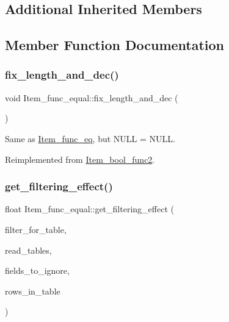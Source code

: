 \subsection*{Additional Inherited Members}


\subsection{Member Function Documentation}
\mbox{\label{classItem__func__equal_a3fe9df49488e4bb555010012b878b499}} 
\subsubsection{\texorpdfstring{fix\+\_\+length\+\_\+and\+\_\+dec()}{fix\_length\_and\_dec()}}
{\footnotesize\ttfamily void Item\+\_\+func\+\_\+equal\+::fix\+\_\+length\+\_\+and\+\_\+dec (\begin{DoxyParamCaption}{ }\end{DoxyParamCaption})\hspace{0.3cm}{\ttfamily [virtual]}}

Same as \mbox{\hyperlink{classItem__func__eq}{Item\+\_\+func\+\_\+eq}}, but N\+U\+LL = N\+U\+LL. 

Reimplemented from \mbox{\hyperlink{classItem__bool__func2}{Item\+\_\+bool\+\_\+func2}}.

\mbox{\label{classItem__func__equal_ac9f18925664d02a73530813c3c2f2710}} 
\subsubsection{\texorpdfstring{get\+\_\+filtering\+\_\+effect()}{get\_filtering\_effect()}}
{\footnotesize\ttfamily float Item\+\_\+func\+\_\+equal\+::get\+\_\+filtering\+\_\+effect (\begin{DoxyParamCaption}\item[{table\+\_\+map}]{filter\+\_\+for\+\_\+table,  }\item[{table\+\_\+map}]{read\+\_\+tables,  }\item[{const M\+Y\+\_\+\+B\+I\+T\+M\+AP $\ast$}]{fields\+\_\+to\+\_\+ignore,  }\item[{double}]{rows\+\_\+in\+\_\+table }\end{DoxyParamCaption})\hspace{0.3cm}{\ttfamily [virtual]}}

